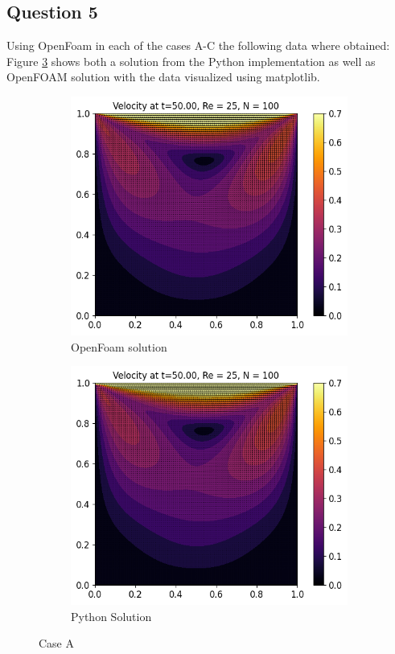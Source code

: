 \documentclass[10pt]{report}
\begin{document}
\subsection*{Question 5}
Using OpenFoam in each of the cases A-C the following data where obtained: Figure \ref{caseA} shows
both a solution from the Python implementation as well as OpenFOAM solution with the data visualized using matplotlib.

\begin{figure}[H]
    \centering
    \begin{subfigure}[b]{0.475\textwidth}
        \centering
        \includegraphics[width=\textwidth]{plots/velocity_RE25_OF.png}
        \caption{OpenFoam solution}
        \label{caseAof}
    \end{subfigure}
    \hfill
    \begin{subfigure}[b]{0.475\textwidth}
        \centering
        \includegraphics[width=\textwidth]{plots/velocity_RE25.png}
        \caption{Python Solution}
        \label{caseApy}
    \end{subfigure}
    \caption{Case A}
    \label{caseA}
\end{figure}
\end{document}
